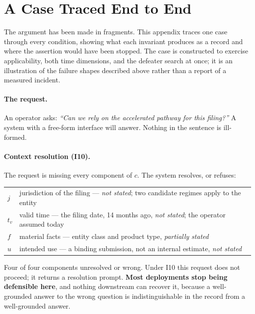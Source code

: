 \appendix
\section{A Case Traced End to End}
\label{sec:worked}

The argument has been made in fragments. This appendix traces one case through every
condition, showing what each invariant produces as a record and where the assertion
would have been stopped. The case is constructed to exercise applicability, both time
dimensions, and the defeater search at once; it is an illustration of the failure shapes
described above rather than a report of a measured incident.

\paragraph{The request.} An operator asks: \emph{``Can we rely on the accelerated
pathway for this filing?''} A system with a free-form interface will answer. Nothing in
the sentence is ill-formed.

\paragraph{Context resolution (I10).} The request is missing every component of $c$. The
system resolves, or refuses:

\begin{center}
\small
\begin{tabular}{@{}l>{\raggedright\arraybackslash}p{8.9cm}@{}}
\toprule
$j$ & jurisdiction of the filing --- \emph{not stated}; two candidate regimes apply to
      the entity \\
$t_v$ & valid time --- the filing date, 14 months ago, \emph{not stated}; the operator
      assumed today \\
$f$ & material facts --- entity class and product type, \emph{partially stated} \\
$u$ & intended use --- a binding submission, not an internal estimate,
      \emph{not stated} \\
\bottomrule
\end{tabular}
\end{center}

Four of four components unresolved or wrong. Under I10 this request does not proceed; it
returns a resolution prompt. \textbf{Most deployments stop being defensible here}, and
nothing downstream can recover it, because a well-grounded answer to the wrong question
is indistinguishable in the record from a well-grounded answer.

